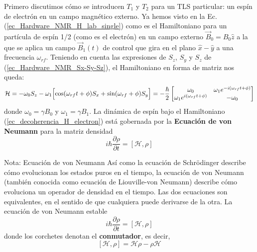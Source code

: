 \documentclass[a4paper,11pt]{book} %
\numberwithin{equation}{chapter}
\def\lc{\left[}
\def\rc{\right]}
\def\Lc{\Bigl[}
\def\Rc{\Bigr]}
\begin{document}
Primero discutimos cómo se introducen $T_1$ y $T_2$ para un TLS particular: un espín de electrón en un campo magnético externo. Ya hemos visto en la Ec. (\ref{ec_Hardware_NMR_H_lab_single}) como es el Hamiltoniano para un partícula de espín 1/2 (como es el electrón) en un campo externo $\vec{B}_0 = B_0 \hat{z}$ a la que se aplica un campo $\vec{B}_1(t)$ de control que gira en el plano $\hat{x}- \hat{y}$ a una frecuencia $\omega_{rf}$. Teniendo en cuenta las expresiones de $S_z$, $S_y$ y $S_z$ de (\ref{ec_Hardware_NMR_Sx-Sy-Sz}), el Hamiltoniano en forma de matriz nos queda:
	\begin{equation} \label{ec_decoherencia_H_electron}
	\mathcal{H} = - \omega_0 S_z - \omega_1 \Lc \cos (\omega_{rf} t+ \phi) S_x + \sin (\omega_{rf} + \phi) S_y \Rc 
	= - \frac{\hbar}{2} \begin{bmatrix}
	\omega_0                               &  \omega_1 e^{-i (\omega_{rf} t + \phi)} \\
	\omega_1 e^{i (\omega_{rf} t + \phi)}  &  -\omega_0 
	\end{bmatrix}
	\end{equation}
donde $\omega_0 = \gamma B_0$ y $\omega_1 = \gamma B_1$. La dinámica de espín bajo el Hamiltoniano (\ref{ec_decoherencia_H_electron}) está gobernada por la \textbf{Ecuación de von Neumann} para la matriz densidad
	\begin{equation}
	i \hbar \frac{\partial \rho}{\partial t} = \lc \mathcal{H}, \rho \rc
	\end{equation}


	\begin{mybox_blue}{Nota: Ecuación de von Neumann}
	Así como la ecuación de Schrödinger describe cómo evolucionan los estados puros en el tiempo, la 
	ecuación de von Neumann (también conocida como ecuación de Liouville-von Neumann) describe cómo 
	evoluciona un operador de densidad en el tiempo. Las dos ecuaciones son equivalentes, en el 
	sentido de que cualquiera puede derivarse de la otra. La ecuación de von Neumann estable
	\begin{equation}
	i \hbar \frac{\partial \rho}{\partial t} = \lc \mathcal{H}, \rho \rc
	\end{equation}
	donde los corchetes denotan el \textbf{conmutador}, es decir,
	\begin{equation}
	\lc \mathcal{H}, \rho \rc = \mathcal{H} \rho - \rho \mathcal{H}
	\end{equation}
	\end{mybox_blue}
\end{document}
